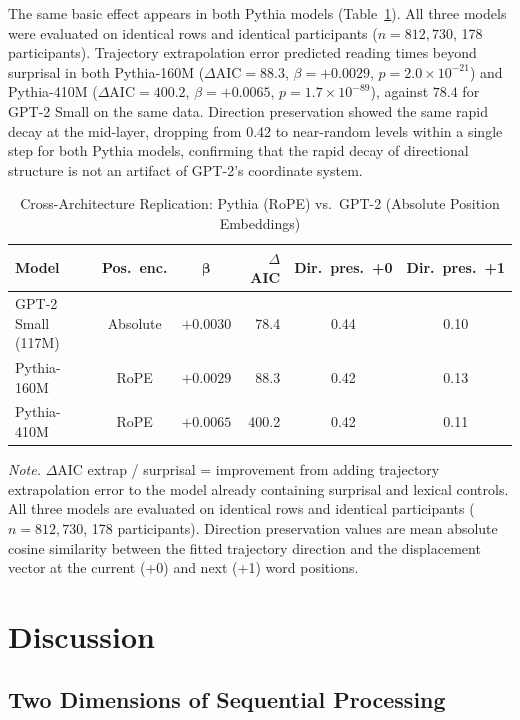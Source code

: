 \documentclass[12pt]{article}
\newcommand{\new}[1]{#1}   %
\begin{document}
The same basic effect appears in both Pythia models (Table~\ref{tab:crossarch}). \new{All three models were evaluated on identical rows and identical participants ($n = 812{,}730$, 178 participants). Trajectory extrapolation error predicted reading times beyond surprisal in both Pythia-160M ($\Delta\text{AIC} = 88.3$, $\beta = +0.0029$, $p = 2.0 \times 10^{-21}$) and Pythia-410M ($\Delta\text{AIC} = 400.2$, $\beta = +0.0065$, $p = 1.7 \times 10^{-89}$), against $78.4$ for GPT-2 Small on the same data.} Direction preservation showed the same rapid decay at the mid-layer, dropping from 0.42 to near-random levels within a single step for both Pythia models, confirming that the \new{rapid decay of directional structure} is not an artifact of GPT-2's coordinate system.

\begin{table}[!htbp]
\centering
\caption{Cross-Architecture Replication: Pythia (RoPE) vs.\ GPT-2 (Absolute Position Embeddings)}
\label{tab:crossarch}
\begin{tabular}{lccrcc}
\toprule
\textbf{Model} & \textbf{Pos.\ enc.} & \new{$\boldsymbol{\beta}$} & \textbf{$\Delta$AIC} & \textbf{Dir.\ pres.\ +0} & \textbf{Dir.\ pres.\ +1} \\
\midrule
GPT-2 Small (117M) & Absolute & \new{$+0.0030$} & \new{78.4} & 0.44 & 0.10 \\
Pythia-160M & RoPE & \new{$+0.0029$} & \new{88.3} & 0.42 & 0.13 \\
Pythia-410M & RoPE & \new{$+0.0065$} & \new{400.2} & 0.42 & 0.11 \\
\bottomrule
\end{tabular}

\smallskip
\footnotesize
\textit{Note.} $\Delta$AIC extrap / surprisal = improvement from adding trajectory extrapolation error to the model already containing surprisal and lexical controls. \new{All three models are evaluated on identical rows and identical participants ($n = 812{,}730$, 178 participants).} Direction preservation values are mean absolute cosine similarity between the fitted trajectory direction and the displacement vector at the current (+0) and next (+1) word positions.
\end{table}

\FloatBarrier

\section{Discussion}

\subsection{Two Dimensions of Sequential Processing}
\end{document}
